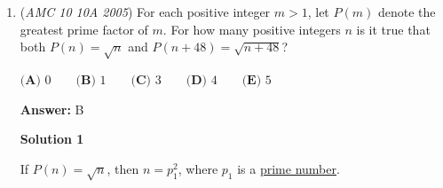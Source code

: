 \begin{enumerate}
 $AC = 1$

 Get the height $CD = \sqrt{(AC)(BC)} = \sqrt2$ via power of a point.

 $CO = AO - AC = 1/2$.

 By altitude of right triangle $\triangle CDO$: Altitude from $C$ to $DE$ is same as altitude from $C$ to $DO$ is $\frac{(CO)(CD)}{DO} = \frac{(1/2)(\sqrt2)}{\frac 3 2}$.

 $\triangle DCE$ and $\triangle ABD$ have the same (diameter) hypotenuse length, so their area ratio is their altitude ratio is$\frac {\frac{ (1/2)(\sqrt2) } {\frac 3 2}} {\sqrt2} = \boxed{1/3}$.

 



\textbf{Solution 6}

Think about $DE$ and $AB$ intersecting at $X$. Now we realize that $XA = XB = XE = XD$ (this distance is just the radius of the circle), so that means that $X$ is the center.

 So this can help us conclude that $\triangle ABE$ and $\triangle ADB$ are right triangles, and since it’s a rectangle setup, by Side-Angle-Side they are similar:$\triangle ABE \sim \triangle ADB.$

 So because of this, the altitudes of $\triangle DCE$, $\triangle ABE$, and $\triangle ADB$ are the same (with $CD$ as the altitude). Hence we need to find the ratio$\frac{2CX}{AB}.$

 We have 
 \[AC:CB = 1:2 \Rightarrow \quad AX:XB = 1:1 \Rightarrow AC:CX = 2:1.\]

 Since $AC:CB = 1:2$, it follows that
 \[BX:CX = 1:4 \Rightarrow CX:AB = 1:6.\]

 Therefore,
 \[\frac{2CX}{AB} = 2 \cdot \frac{1}{6} = \boxed{\frac{1}{3}}\]



	\item (\textit{AMC 10 10A 2005}) For each positive integer $m > 1$, let $P(m)$ denote the greatest prime factor of $m$. For how many positive integers $n$ is it true that both $P(n) = \sqrt{n}$ and $P(n+48) = \sqrt{n+48}$?


 $\textbf{(A) } 0\qquad \textbf{(B) } 1\qquad \textbf{(C) } 3\qquad \textbf{(D) } 4\qquad \textbf{(E) } 5$

 \textbf{Answer: }B



\textbf{Solution 1}

If $P(n) = \sqrt{n}$, then $n = p_{1}^{2}$, where $p_{1}$ is a \href{https://artofproblemsolving.com/wiki/index.php?title=Prime\_number}{prime number}.


\end{enumerate}
